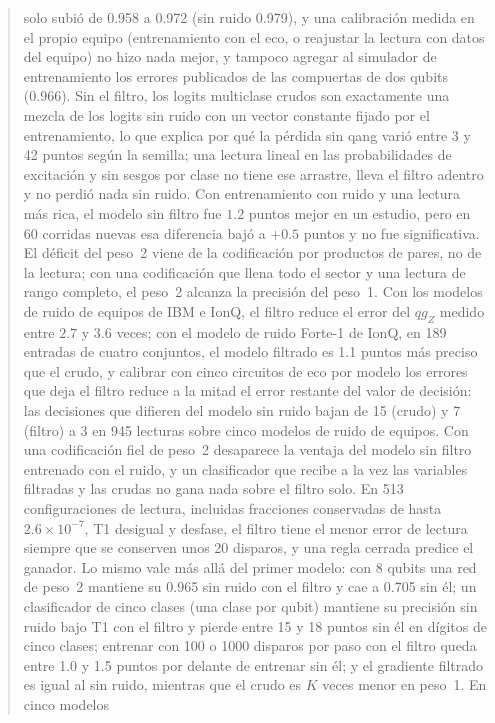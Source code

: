 \documentclass[11pt]{article}
\newcommand{\qZ}{qg_Z}
\begin{document}
\begin{abstract}
solo subió de 0.958 a 0.972 (sin ruido 0.979), y una calibración medida en el propio equipo (entrenamiento con el
eco, o reajustar la lectura con datos del equipo) no hizo nada mejor, y tampoco agregar al simulador de entrenamiento
los errores publicados de las compuertas de dos qubits (0.966). Sin el filtro, los logits multiclase crudos son
exactamente una mezcla de los logits sin ruido con un vector constante fijado por el entrenamiento, lo que explica por
qué la pérdida sin qang varió entre 3 y 42 puntos según la semilla; una lectura lineal en las probabilidades de excitación y sin sesgos por clase
no tiene ese arrastre, lleva el filtro adentro y no perdió nada sin ruido. Con entrenamiento con ruido y una lectura más rica, el modelo sin
filtro fue $1.2$ puntos mejor en un estudio, pero en 60 corridas nuevas esa diferencia bajó a $+0.5$ puntos y no
fue significativa. El déficit del peso~2
viene de la codificación por productos de pares, no de la lectura; con una codificación que llena todo el
sector y una lectura de rango completo, el peso~2 alcanza la precisión del peso~1. Con los modelos de ruido de equipos de
IBM e IonQ, el filtro reduce el error del $\qZ$ medido entre $2.7$ y $3.6$ veces; con el modelo de ruido Forte-1 de IonQ, en
189 entradas de cuatro conjuntos, el modelo filtrado es 1.1 puntos más preciso que el crudo, y calibrar con cinco circuitos de eco por modelo los
errores que deja el filtro reduce a la mitad el error restante del valor de decisión: las decisiones que difieren del
modelo sin ruido bajan de 15 (crudo) y 7 (filtro) a 3 en 945 lecturas sobre cinco modelos de ruido de equipos. Con una codificación
fiel de peso~2 desaparece la ventaja del modelo sin filtro entrenado con el ruido, y un clasificador que recibe a la
vez las variables filtradas y las crudas no gana nada sobre el filtro solo. En 513 configuraciones de lectura,
incluidas fracciones conservadas de hasta $2.6\times10^{-7}$, T1 desigual y desfase, el filtro tiene el menor error de
lectura siempre que se conserven unos 20 disparos, y una regla cerrada predice el ganador. Lo mismo vale más allá del primer
modelo: con 8 qubits una red de peso~2 mantiene su 0.965 sin ruido con el filtro y cae a 0.705 sin él; un clasificador
de cinco clases (una clase por qubit) mantiene su precisión sin ruido bajo T1 con el filtro y pierde entre 15 y 18 puntos
sin él en dígitos de cinco clases; entrenar con 100 o 1000 disparos por paso con el filtro queda entre 1.0 y 1.5 puntos por delante de entrenar sin
él; y el gradiente filtrado es igual al sin ruido, mientras que el crudo es $K$ veces menor en peso~1. En cinco modelos

\end{abstract}
\end{document}
